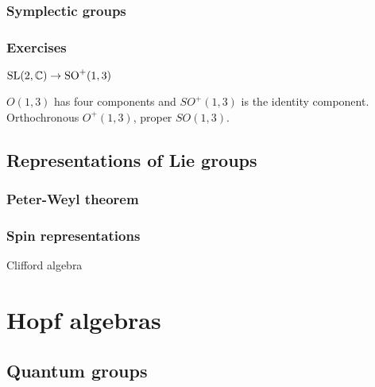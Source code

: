 \documentclass{../note}
\begin{document}
\section{Symplectic groups}

\section*{Exercises}
\begin{prb}
$\mathrm{SL}(2,\mathbb{C})\to\mathrm{SO}^+(1,3)$
\begin{parts}
\item $O(1,3)$ has four components and $SO^+(1,3)$ is the identity component. Orthochronous $O^+(1,3)$, proper $SO(1,3)$.
\end{parts}
\end{prb}

\chapter{Representations of Lie groups}
\section{Peter-Weyl theorem}
\section{Spin representations}
Clifford algebra






\part{Hopf algebras}
\chapter{}
\chapter{Quantum groups}
\end{document}
